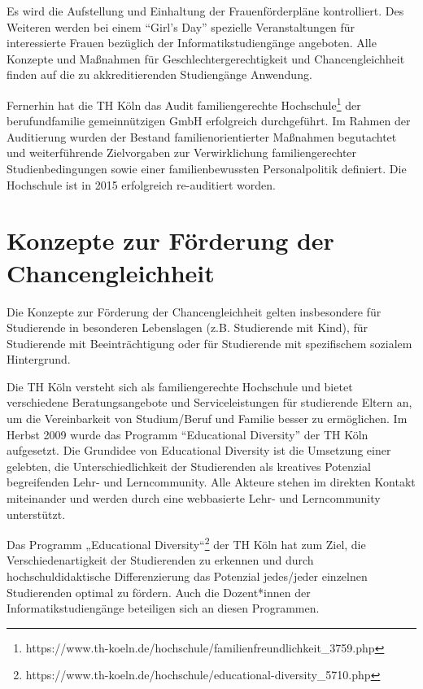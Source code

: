 Es wird die Aufstellung und Einhaltung der Frauenförderpläne
kontrolliert. Des Weiteren werden bei einem ``Girl's Day'' spezielle
Veranstaltungen für interessierte Frauen bezüglich der
Informatikstudiengänge angeboten. Alle Konzepte und Maßnahmen für
Geschlechtergerechtigkeit und Chancengleichheit finden auf die zu
akkreditierenden Studiengänge Anwendung.

Fernerhin hat die TH Köln das Audit familiengerechte
Hochschule\footnote{https://www.th-koeln.de/hochschule/familienfreundlichkeit\_3759.php}
der berufundfamilie gemeinnützigen GmbH erfolgreich durchgeführt. Im
Rahmen der Auditierung wurden der Bestand familienorientierter Maßnahmen
begutachtet und weiterführende Zielvorgaben zur Verwirklichung
familiengerechter Studienbedingungen sowie einer familienbewussten
Personalpolitik definiert. Die Hochschule ist in 2015 erfolgreich
re-auditiert worden.

\section{Konzepte zur Förderung der
Chancengleichheit}\label{konzepte-zur-fuxf6rderung-der-chancengleichheit}

Die Konzepte zur Förderung der Chancengleichheit gelten insbesondere für
Studierende in besonderen Lebenslagen (z.B. Studierende mit Kind), für
Studierende mit Beeinträchtigung oder für Studierende mit spezifischem
sozialem Hintergrund.

Die TH Köln versteht sich als familiengerechte Hochschule und bietet
verschiedene Beratungsangebote und Serviceleistungen für studierende
Eltern an, um die Vereinbarkeit von Studium/Beruf und Familie besser zu
ermöglichen. Im Herbst 2009 wurde das Programm ``Educational Diversity''
der TH Köln aufgesetzt. Die Grundidee von Educational Diversity ist die
Umsetzung einer gelebten, die Unterschiedlichkeit der Studierenden als
kreatives Potenzial begreifenden Lehr- und Lerncommunity. Alle Akteure
stehen im direkten Kontakt miteinander und werden durch eine webbasierte
Lehr- und Lerncommunity unterstützt.

Das Programm „Educational Diversity``\footnote{https://www.th-koeln.de/hochschule/educational-diversity\_5710.php}
der TH Köln hat zum Ziel, die Verschiedenartigkeit der Studierenden zu
erkennen und durch hochschuldidaktische Differenzierung das Potenzial
jedes/jeder einzelnen Studierenden optimal zu fördern. Auch die
Dozent*innen der Informatikstudiengänge beteiligen sich an diesen
Programmen.

